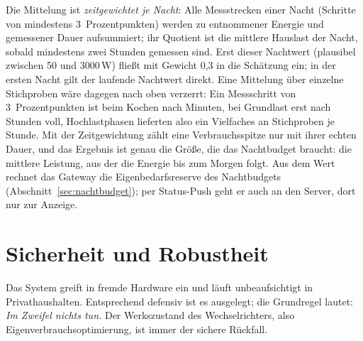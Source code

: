 \documentclass[11pt,a4paper]{article}
\begin{document}
Die Mittelung ist \emph{zeitgewichtet je Nacht}: Alle Messstrecken einer
Nacht (Schritte von mindestens 3~Prozentpunkten) werden zu entnommener
Energie und gemessener Dauer aufsummiert; ihr Quotient ist die mittlere
Hauslast der Nacht, sobald mindestens zwei Stunden gemessen sind. Erst
dieser Nachtwert (plausibel zwischen 50 und 3000\,W) fließt mit Gewicht 0,3
in die Schätzung ein; in der ersten Nacht gilt der laufende Nachtwert
direkt. Eine Mittelung über einzelne Stichproben wäre dagegen nach oben
verzerrt: Ein Messschritt von 3~Prozentpunkten ist beim Kochen nach
Minuten, bei Grundlast erst nach Stunden voll, Hochlastphasen lieferten
also ein Vielfaches an Stichproben je Stunde. Mit der Zeitgewichtung zählt
eine Verbrauchsspitze nur mit ihrer echten Dauer, und das Ergebnis ist
genau die Größe, die das Nachtbudget braucht: die mittlere Leistung, aus
der die Energie bis zum Morgen folgt. Aus dem Wert rechnet das Gateway die
Eigenbedarfsreserve des Nachtbudgets (Abschnitt~\ref{sec:nachtbudget}); per
Status-Push geht er auch an den Server, dort nur zur Anzeige.

\section{Sicherheit und Robustheit}\label{sec:sicherheit}

Das System greift in fremde Hardware ein und läuft unbeaufsichtigt in
Privathaushalten. Entsprechend defensiv ist es ausgelegt; die Grundregel
lautet: \emph{Im Zweifel nichts tun.} Der Werkszustand des Wechselrichters,
also Eigenverbrauchsoptimierung, ist immer der sichere Rückfall.
\end{document}
